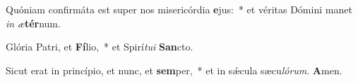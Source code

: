 \item Quóniam confirmáta est super nos misericórdia \textbf{e}jus:~* et véritas Dómini manet \textit{in} \textit{æ}\textbf{tér}num.
\item Glória Patri, et \textbf{Fí}lio,~* et Spirí\tinyhspace\textit{tui} \textbf{San}cto.
\item Sicut erat in princípio, et nunc, et \textbf{sem}per,~* et in sǽcula sæcu\tinyhspace\textit{lórum}. \textbf{A}men.
